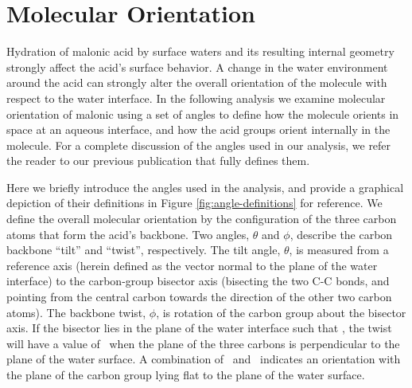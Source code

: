 \section {Molecular Orientation}

Hydration of malonic acid by surface waters and its resulting internal geometry strongly affect the acid's surface behavior. A change in the water environment around the acid can strongly alter the overall orientation of the molecule with respect to the water interface. In the following analysis we examine molecular orientation of malonic using a set of angles to define how the molecule orients in space at an aqueous interface, and how the acid groups orient internally in the molecule. For a complete discussion of the angles used in our analysis, we refer the reader to our previous publication that fully defines them.\cite{Blower2012}

Here we briefly introduce the angles used in the analysis, and provide a graphical depiction of their definitions in Figure \ref{fig:angle-definitions} for reference. We define the overall molecular orientation by the configuration of the three carbon atoms that form the acid's backbone. Two angles, $\theta$ and $\phi$, describe the carbon backbone ``tilt'' and ``twist'', respectively. The tilt angle, $\theta$, is measured from a reference axis (herein defined as the vector normal to the plane of the water interface) to the carbon-group bisector axis (bisecting the two C-C bonds, and pointing from the central carbon towards the direction of the other two carbon atoms). The backbone twist, $\phi$, is rotation of the carbon group about the bisector axis. If the bisector lies in the plane of the water interface such that \degr, the twist will have a value of \degr~when the plane of the three carbons is perpendicular to the plane of the water surface. A combination of \degr~and \degr~indicates an orientation with the plane of the carbon group lying flat to the plane of the water surface.

